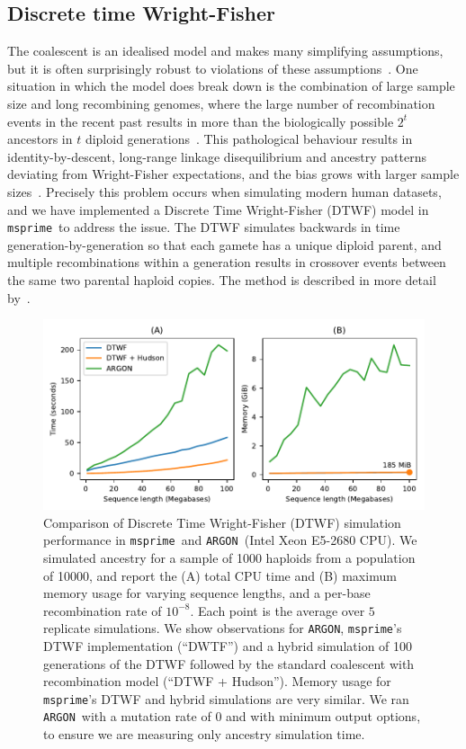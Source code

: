 \documentclass{article}
\newcommand{\msprime}[0]{\texttt{msprime}}
\newcommand{\ARGON}[0]{\texttt{ARGON}}
\begin{document}
\subsection*{Discrete time Wright-Fisher}
The coalescent is an idealised model and makes many simplifying assumptions,
but it is often surprisingly robust to violations of these
assumptions~\citep{wakeley2012gene}. One situation in which the
model does break down is the combination of large sample size
and long recombining genomes, where the large
number of recombination events in the recent past results in
more than the biologically possible $2^t$ ancestors in
$t$ diploid generations~\citep{nelson2020accounting}.
This pathological behaviour results in
identity-by-descent,
long-range linkage disequilibrium and ancestry patterns deviating from
Wright-Fisher expectations, and the bias grows with larger sample
sizes~\citep{wakeley2012gene,bhaskar2014distortion,nelson2020accounting}.
Precisely this problem occurs when simulating modern human datasets,
and we have implemented a Discrete Time Wright-Fisher (DTWF) model
in \msprime\ to address the issue. The DTWF simulates backwards in
time generation-by-generation so that each gamete has a unique
diploid parent, and multiple recombinations within a generation results in
crossover events between the same two parental haploid copies.
The method is described in more detail by~\cite{nelson2020accounting}.

\begin{figure}
\begin{center}
\includegraphics{figures/dtwf-perf}
\end{center}
\caption{\label{fig-dtwf-perf} Comparison of Discrete Time Wright-Fisher
(DTWF) simulation performance in \msprime\ and \ARGON\ (Intel Xeon E5-2680 CPU).
We simulated ancestry for a sample of 1000 haploids from a population of 10000,
and report the (A) total CPU time and (B) maximum memory usage for varying
sequence lengths, and a per-base recombination rate of $10^{-8}$. Each
point is the average over $5$ replicate simulations.
We show observations for \ARGON, \msprime's DTWF implementation (``DWTF'')
and a hybrid simulation of 100 generations of the DTWF followed by
the standard coalescent with recombination model (``DTWF + Hudson'').
Memory usage for \msprime's DTWF and hybrid simulations are very similar.
We ran \ARGON\ with a mutation rate of $0$ and with minimum output options,
to ensure we are measuring only ancestry simulation time.}
\end{figure}
\end{document}
